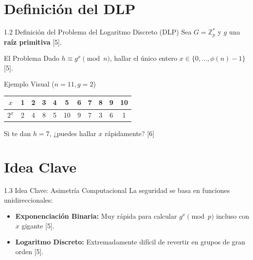 \documentclass{beamer}
\begin{document}
\section{Definición del DLP}
\begin{frame}{1.2 Definición del Problema del Logaritmo Discreto (DLP)}
    Sea $G = \mathbb{Z}_p^*$ y $g$ una \textbf{raíz primitiva} [5].
    \begin{block}{El Problema}
        Dado $h \equiv g^x \pmod n$, hallar el único entero $x \in \{0, \dots, \phi(n)-1\}$ [5].
    \end{block}
    
    \begin{exampleblock}{Ejemplo Visual ($n=11, g=2$)}
        \centering
        \begin{tabular}{|c|c|c|c|c|c|c|c|c|c|c|}
        \hline
        $x$ & 1 & 2 & 3 & 4 & 5 & 6 & 7 & 8 & 9 & 10 \\ \hline
        $2^x$ & 2 & 4 & 8 & 5 & 10 & 9 & 7 & 3 & 6 & 1 \\ \hline
        \end{tabular}
        \small{Si te dan $h=7$, ¿puedes hallar $x$ rápidamente? [6]}
    \end{exampleblock}
\end{frame}

\section{Idea Clave}
\begin{frame}{1.3 Idea Clave: Asimetría Computacional}
    La seguridad se basa en funciones unidireccionales:
    \begin{itemize}
        \item \textbf{Exponenciación Binaria:} Muy rápida para calcular $g^x \pmod p$ incluso con $x$ gigante [5].
        \item \textbf{Logaritmo Discreto:} Extremadamente difícil de revertir en grupos de gran orden [5].
    \end{itemize}
    \begin{figure}
        \centering
    \end{figure}
\end{frame}
\end{document}
